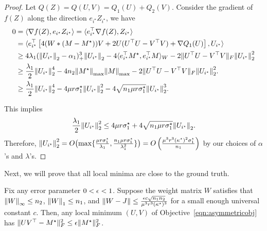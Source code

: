 \begin{proof}
Let $Q(Z) = Q(U,V) = Q_1(U)+Q_2(V)$.
Consider the gradient of $f(Z)$ along the direction $e_{i^\star} Z_{i^\star}$, we have
\begin{align*}
0 & = \langle \nabla f(Z), e_{i^\star} Z_{i^\star}\rangle = \langle e_{i^\star}^\top\nabla f(Z), Z_{i^\star}\rangle \\
& = \langle e_{i^\star}^\top\left[4(W*(M-M^\star))V + 2 U(U^\top U-V^\top V) + \nabla Q_1(U)\right], U_{i^\star}\rangle \\
& \ge 4\lambda_1({\lVert U_{i^\star}{\rVert}}_2-\alpha_1)_+^3{\lVert U_{i^\star}{\rVert}}_2 - 4\langle e_{i^\star}^\top M^\star, e_{i^\star}^\top M\rangle_W - 2 \|U^\top U-V^\top V\|_F {\lVert U_{i^\star}{\rVert}}_2^2 \\
& \ge \frac{\lambda_1}{2}{\lVert U_{i^\star}{\rVert}}_2^4 - 4n_2 {\lVert M^\star{\rVert}}_{\max} {\lVert M{\rVert}}_{\max} - 2 \|U^\top U-V^\top V\|_F {\lVert U_{i^\star}{\rVert}}_2^2. \\
& \ge \frac{\lambda_1}{2}{\lVert U_{i^\star}{\rVert}}_2^4 - 4\mu r\sigma^\star_1{\lVert U_{i^\star}{\rVert}}_2^2 - 4\sqrt{n_1\mu r \sigma^\star_1}{\lVert U_{i^\star}{\rVert}}_2^3. 
\end{align*}

This implies 
\[
\frac{\lambda_1}{2}{\lVert U_{i^\star}{\rVert}}_2^2 \le 4\mu r\sigma^\star_1 + 4\sqrt{n_1\mu r \sigma^\star_1}{\lVert U_{i^\star}{\rVert}}_2.
\]
Therefore, ${\lVert U_{i^\star}{\rVert}}_2^2 = O\bigl(\max\{\frac{\mu r\sigma^\star_1}{\lambda_1}, \frac{n_1\mu r \sigma^\star_1}{\lambda_1^2}\}\bigr) = O\left(\frac{\mu^3 r^3 (\kappa^\star)^2 \sigma^\star_1}{n_1}\right)$ by our choices of $\alpha$'s and $\lambda$'s. 
\end{proof}

Next, we will prove that all local minima are close to the ground truth.

\begin{lemma}
Fix any error parameter $0 < \epsilon < 1$.
Suppose the weight matrix $W$ satisfies that ${\lVert W{\rVert}}_\infty \le n_2$, ${\lVert W{\rVert}}_1 \le n_1$, and $\|W-J\| \le \frac{\epsilon c\sqrt{n_1n_2}}{\mu^3 r^3 (\kappa^\star)^3}$ for a small enough universal constant $c$. Then, any local minimum $(U, V)$ of Objective~\eqref{eqn:asymmetricobj} has $\|UV^\top-M^\star\|_F^2 \le \epsilon \|M^\star\|_F^2$. 
\end{lemma}

